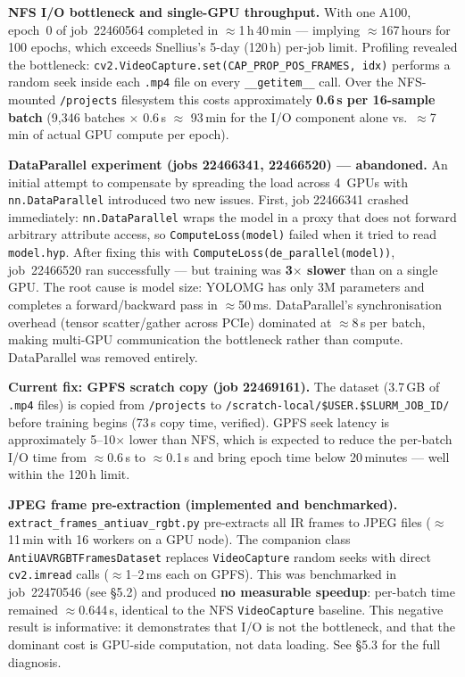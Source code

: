 \textbf{NFS I/O bottleneck and single-GPU throughput.} With one A100,
epoch~0 of job~22460564 completed in $\approx$1\,h\,40\,min —
implying $\approx$167\,hours for 100 epochs, which exceeds Snellius's
5-day (120\,h) per-job limit. Profiling revealed the bottleneck:
\texttt{cv2.VideoCapture.set(CAP\_PROP\_POS\_FRAMES,\,idx)} performs
a random seek inside each \texttt{.mp4} file on every
\texttt{\_\_getitem\_\_} call. Over the NFS-mounted \texttt{/projects}
filesystem this costs approximately \textbf{0.6\,s per 16-sample
batch} (9,346 batches $\times$ 0.6\,s $\approx$ 93\,min for the I/O
component alone vs.\ $\approx$7\,min of actual GPU compute per
epoch).

\textbf{DataParallel experiment (jobs 22466341, 22466520) — abandoned.}
An initial attempt to compensate by spreading the load across 4~GPUs
with \texttt{nn.DataParallel} introduced two new issues. First, job
22466341 crashed immediately: \texttt{nn.DataParallel} wraps the model
in a proxy that does not forward arbitrary attribute access, so
\texttt{ComputeLoss(model)} failed when it tried to read
\texttt{model.hyp}. After fixing this with
\texttt{ComputeLoss(de\_parallel(model))}, job~22466520 ran
successfully — but training was \textbf{3$\times$ slower} than on a
single GPU. The root cause is model size: YOLOMG has only 3M
parameters and completes a forward/backward pass in $\approx$50\,ms.
DataParallel's synchronisation overhead (tensor scatter/gather across
PCIe) dominated at $\approx$8\,s per batch, making multi-GPU
communication the bottleneck rather than compute. DataParallel was
removed entirely.

\textbf{Current fix: GPFS scratch copy (job 22469161).} The dataset
(3.7\,GB of \texttt{.mp4} files) is copied from \texttt{/projects}
to \texttt{/scratch-local/\$USER.\allowbreak\$SLURM\_JOB\_ID/} before training
begins (73\,s copy time, verified). GPFS seek latency is approximately
5--10$\times$ lower than NFS, which is expected to reduce the per-batch
I/O time from $\approx$0.6\,s to $\approx$0.1\,s and bring
epoch time below 20\,minutes — well within the 120\,h limit.

\textbf{JPEG frame pre-extraction (implemented and benchmarked).}
\texttt{extract\_frames\_antiuav\_rgbt.py} pre-extracts all IR frames
to JPEG files ($\approx$11\,min with 16 workers on a GPU node).
The companion class \texttt{AntiUAVRGBTFramesDataset} replaces
\texttt{VideoCapture} random seeks with direct \texttt{cv2.imread}
calls ($\approx$1--2\,ms each on GPFS). This was benchmarked in
job~22470546 (see §5.2) and produced \textbf{no measurable speedup}:
per-batch time remained $\approx$0.644\,s, identical to the NFS
\texttt{VideoCapture} baseline. This negative result is informative:
it demonstrates that I/O is not the bottleneck, and that the dominant
cost is GPU-side computation, not data loading. See §5.3 for the
full diagnosis.

